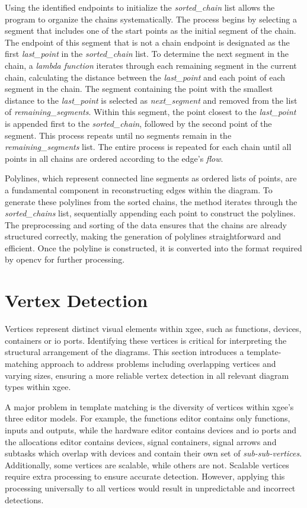Using the identified endpoints to initialize the \textit{sorted\_chain} list allows the program to organize the chains systematically. The process begins by selecting a segment that includes one of the start points as the initial segment of the chain. The endpoint of this segment that is not a chain endpoint is designated as the first \textit{last\_point} in the \textit{sorted\_chain} list. To determine the next segment in the chain, a \textit{lambda function} iterates through each remaining segment in the current chain, calculating the distance between the \textit{last\_point} and each point of each segment in the chain. The segment containing the point with the smallest distance to the \textit{last\_point} is selected as \textit{next\_segment} and removed from the list of \textit{remaining\_segments}. Within this segment, the point closest to the \textit{last\_point} is appended first to the \textit{sorted\_chain}, followed by the second point of the segment. This process repeats until no segments remain in the \textit{remaining\_segments} list. The entire process is repeated for each chain until all points in all chains are ordered according to the edge's \textit{flow}.

Polylines, which represent connected line segments as ordered lists of points, are a fundamental component in reconstructing edges within the diagram. To generate these polylines from the sorted chains, the method iterates through the \textit{sorted\_chains} list, sequentially appending each point to construct the polylines. The preprocessing and sorting of the data ensures that the chains are already structured correctly, making the generation of polylines straightforward and efficient. Once the polyline is constructed, it is converted into the format required by \acrshort{opencv} for further processing.

\section{Vertex Detection}
\label{sec:vertex_detection}
Vertices represent distinct visual elements within \acrshort{xgee}, such as functions, devices, containers or \acrshort{io} ports. Identifying these vertices is critical for interpreting the structural arrangement of the diagrams. This section introduces a template-matching approach to address problems including overlapping vertices and varying sizes, ensuring a more reliable vertex detection in all relevant diagram types within \acrshort{xgee}.

A major problem in template matching is the diversity of vertices within \acrshort{xgee}'s three editor models. For example, the functions editor contains only functions, inputs and outputs, while the hardware editor contains devices and \acrshort{io} ports and the allocations editor contains devices, signal containers, signal arrows and subtasks which overlap with devices and contain their own set of \textit{sub-sub-vertices}. Additionally, some vertices are scalable, while others are not. Scalable vertices require extra processing to ensure accurate detection. However, applying this processing universally to all vertices would result in unpredictable and incorrect detections.

